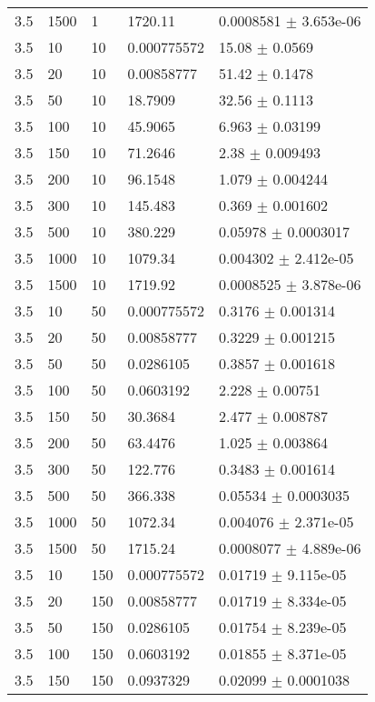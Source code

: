 \begin{longtable}{lllll}
 3.5 &  1500 &     1 &  1720.11 & 0.0008581 $\pm$ 3.653e-06 \\
 3.5 &    10 &    10 & 0.000775572 &    15.08 $\pm$   0.0569 \\
 3.5 &    20 &    10 & 0.00858777 &    51.42 $\pm$   0.1478 \\
 3.5 &    50 &    10 &  18.7909 &    32.56 $\pm$   0.1113 \\
 3.5 &   100 &    10 &  45.9065 &    6.963 $\pm$  0.03199 \\
 3.5 &   150 &    10 &  71.2646 &     2.38 $\pm$ 0.009493 \\
 3.5 &   200 &    10 &  96.1548 &    1.079 $\pm$ 0.004244 \\
 3.5 &   300 &    10 &  145.483 &    0.369 $\pm$ 0.001602 \\
 3.5 &   500 &    10 &  380.229 &  0.05978 $\pm$ 0.0003017 \\
 3.5 &  1000 &    10 &  1079.34 & 0.004302 $\pm$ 2.412e-05 \\
 3.5 &  1500 &    10 &  1719.92 & 0.0008525 $\pm$ 3.878e-06 \\
 3.5 &    10 &    50 & 0.000775572 &   0.3176 $\pm$ 0.001314 \\
 3.5 &    20 &    50 & 0.00858777 &   0.3229 $\pm$ 0.001215 \\
 3.5 &    50 &    50 & 0.0286105 &   0.3857 $\pm$ 0.001618 \\
 3.5 &   100 &    50 & 0.0603192 &    2.228 $\pm$  0.00751 \\
 3.5 &   150 &    50 &  30.3684 &    2.477 $\pm$ 0.008787 \\
 3.5 &   200 &    50 &  63.4476 &    1.025 $\pm$ 0.003864 \\
 3.5 &   300 &    50 &  122.776 &   0.3483 $\pm$ 0.001614 \\
 3.5 &   500 &    50 &  366.338 &  0.05534 $\pm$ 0.0003035 \\
 3.5 &  1000 &    50 &  1072.34 & 0.004076 $\pm$ 2.371e-05 \\
 3.5 &  1500 &    50 &  1715.24 & 0.0008077 $\pm$ 4.889e-06 \\
 3.5 &    10 &   150 & 0.000775572 &  0.01719 $\pm$ 9.115e-05 \\
 3.5 &    20 &   150 & 0.00858777 &  0.01719 $\pm$ 8.334e-05 \\
 3.5 &    50 &   150 & 0.0286105 &  0.01754 $\pm$ 8.239e-05 \\
 3.5 &   100 &   150 & 0.0603192 &  0.01855 $\pm$ 8.371e-05 \\
 3.5 &   150 &   150 & 0.0937329 &  0.02099 $\pm$ 0.0001038 \\

\end{longtable}
